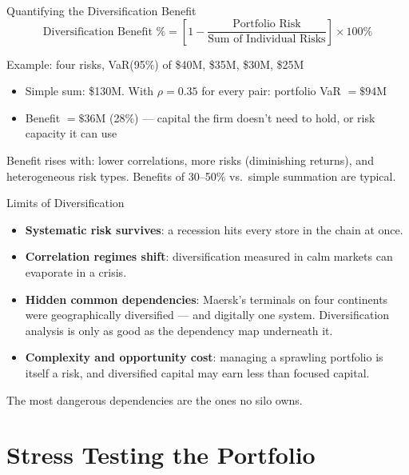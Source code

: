 \documentclass[11pt, aspectratio=169]{beamer}
\begin{document}
\begin{frame}{Quantifying the Diversification Benefit}
\[
\text{Diversification Benefit \%}
  = \left[1 - \frac{\text{Portfolio Risk}}{\text{Sum of Individual Risks}}\right] \times 100\%
\]
\begin{exampleblock}{Example: four risks, VaR(95\%) of \$40M, \$35M, \$30M, \$25M}
\begin{itemize}
  \item Simple sum: \$130M. With $\rho = 0.35$ for every pair: portfolio VaR $= \$94$M
  \item Benefit $= \$36$M (28\%) --- capital the firm doesn't need to hold, or risk capacity it can use
\end{itemize}
\end{exampleblock}
\medskip
Benefit rises with: lower correlations, more risks (diminishing returns), and \alert{heterogeneous} risk types. Benefits of 30--50\% vs.\ simple summation are typical.
\end{frame}

\begin{frame}{Limits of Diversification}
\begin{itemize}
  \item \textbf{Systematic risk survives}: a recession hits every store in the chain at once.
  \item \textbf{Correlation regimes shift}: diversification measured in calm markets can evaporate in a crisis.
  \item \textbf{Hidden common dependencies}: Maersk's terminals on four continents were geographically diversified --- and digitally one system. Diversification analysis is only as good as the dependency map underneath it.
  \item \textbf{Complexity and opportunity cost}: managing a sprawling portfolio is itself a risk, and diversified capital may earn less than focused capital.
\end{itemize}
\medskip
The most dangerous dependencies are the ones no silo owns.
\end{frame}

\section{Stress Testing the Portfolio}
\end{document}
